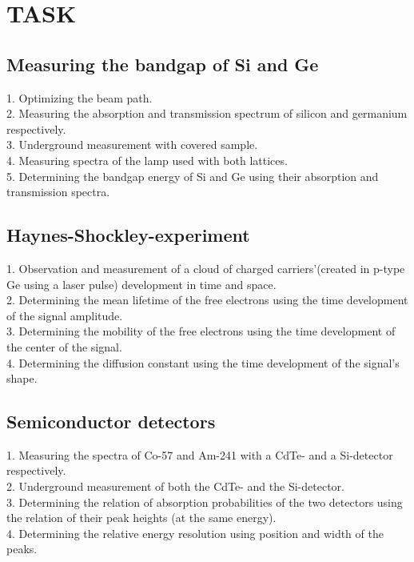 \chapter{TASK}
\section{Measuring the bandgap of Si and Ge} 
1. Optimizing the beam path. \\
2. Measuring the absorption and transmission spectrum of silicon and germanium respectively. \\
3. Underground measurement with covered sample. \\
4. Measuring spectra of the lamp used with both lattices. \\
5. Determining the bandgap energy of Si and Ge using their absorption and transmission spectra. \\
\section{Haynes-Shockley-experiment} 
1. Observation and measurement of a cloud of charged carriers'(created in p-type Ge using a laser pulse) development in time and space. \\
2. Determining the mean lifetime of the free electrons using the time development of the signal amplitude. \\
3. Determining the mobility of the free electrons using the time development of the center of the signal. \\
4. Determining the diffusion constant using the time development of the signal's shape.\\
\section{Semiconductor detectors} 
1. Measuring the spectra of Co-57 and Am-241 with a CdTe- and a Si-detector respectively. \\
2. Underground measurement of both the CdTe- and the Si-detector. \\
3. Determining the relation of absorption probabilities of the two detectors using the relation of their peak heights (at the same energy). \\
4. Determining the relative energy resolution using position and width of the peaks.